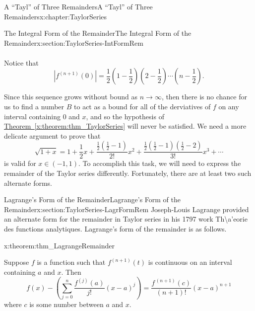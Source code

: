 \begin{chapterptx}{A ``Tayl'' of Three Remainders}{}{A ``Tayl'' of Three Remainders}{}{}{x:chapter:TaylorSeries}
\begin{sectionptx}{The Integral Form of the Remainder}{}{The Integral Form of the Remainder}{}{}{x:section:TaylorSeries-IntFormRem}
\begin{align*}
		\end{align*}
		\par
		Notice that%
		\begin{equation*}
			\left|f^{(n+1)}(0)\right|=\frac{1}{2}\left(1-\frac{1}{2}\right)\left(2-\frac{1}{2}\right)\cdots\left(n-\frac{1}{2}\right)\text{.}
		\end{equation*}
		\par
		Since this sequence grows without bound as \(n\rightarrow\infty\), then there is no chance for us to find a number \(B\) to act as a bound for all of the derviatives of \(f\) on any interval containing 0 and\(\) \(x\), and so the hypothesis of \hyperref[x:theorem:thm_TaylorSeries]{Theorem~{\xreffont\ref{x:theorem:thm_TaylorSeries}}} will never be satisfied. We need a more delicate argument to prove that%
		\begin{equation*}
			\sqrt{1+x}=1+\frac{1}{2}x+\frac{\frac{1}{2}\left(\frac{1}{2}-1\right)}{2!}x^2+\frac{\frac{1}{2}\left(\frac{1}{2}-1\right)\left(\frac{1}{2}-2\right)}{3!}x^3+\cdots
		\end{equation*}
		is valid for \(x\in(-1,1)\). To accomplish this task, we will need to express the remainder of the Taylor series differently. Fortunately, there are at least two such alternate forms.%
	\end{sectionptx}
	\typeout{************************************************}
	\typeout{************************************************}
	\begin{sectionptx}{Lagrange's Form of the Remainder}{}{Lagrange's Form of the Remainder}{}{}{x:section:TaylorSeries-LagrFormRem}
		Joseph-Louis Lagrange  provided an alternate form for the remainder in Taylor series in his 1797 work \textbraceleft{}Th\textbackslash{}a'eorie des functions analytiques.\textbraceright{} Lagrange's form of the remainder is as follows.%
		\begin{theorem}{}{}{x:theorem:thm_LagrangeRemainder}%
			\par
			 Suppose \(f\) is a function such that \(f^{(n+1)}(t)\) is continuous on an interval containing \(a\) and \(x\). Then%
			\begin{equation*}
				f(x)-\left(\sum_{j=0}^n\frac{f^{(j)}(a)}{j!}(x-a)^j\right)=\frac{f^{\, (n+1)}(c)}{(n+1)!}(x-a)^{n+1}
			\end{equation*}
			where \(c\) is some number between \(a\) and \(x\).%

\end{theorem}
\end{sectionptx}
\end{chapterptx}
